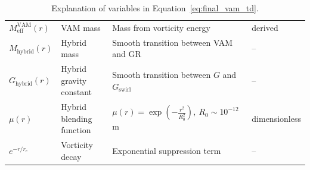 \begin{table}
\begin{tabular}{llll}
        $M_{\text{eff}}^\text{VAM}(r)$ & VAM mass & Mass from vorticity energy & derived \\
        $M_{\text{hybrid}}(r)$ & Hybrid mass & Smooth transition between VAM and GR & -- \\
        $G_{\text{hybrid}}(r)$ & Hybrid gravity constant & Smooth transition between $G$ and $G_\text{swirl}$ & -- \\
        $\mu(r)$ & Hybrid blending function & $\mu(r) = \exp\left(-\frac{r^2}{R_0^2}\right),\ R_0 \sim 10^{-12}$ m & dimensionless \\
        $e^{-r/r_c}$ & Vorticity decay & Exponential suppression term & -- \\
        \bottomrule
    \end{tabular}
    \caption{Explanation of variables in Equation~\ref{eq:final_vam_td}.}
    \label{tab:time_dilation_variables}
\end{table}



